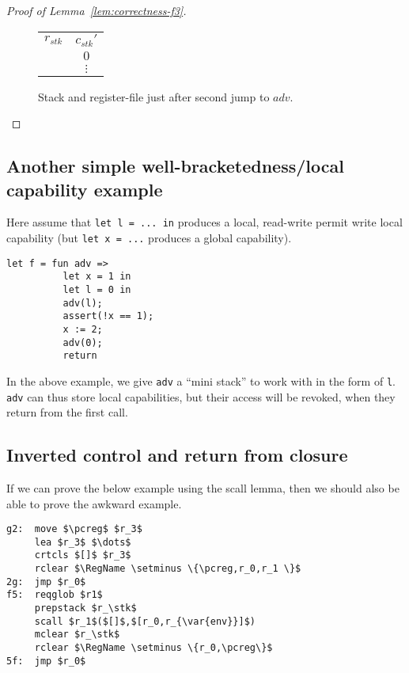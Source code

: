 \documentclass[a4paper]{article}
\newcommand{\var}[1]{\mathit{#1}}
\newcommand{\pcreg}{\mathrm{pc}}
\newcommand{\adv}{\var{adv}}
\newcommand{\stk}{\var{stk}}
\newcommand{\plaindom}[1]{\mathrm{#1}}
\newcommand{\RegName}{\plaindom{RegisterName}}
\begin{document}
\begin{proof}[Proof of Lemma~\ref{lem:correctness-f3}]
\begin{enumproof}[start=3]
\begin{enumproof}[start=3]
\begin{figure}
\begin{tabular}{r |c |}
          \cline{2-2}
          $r_{\var{stk}}$  & $c_{\var{stk}}'$ \\
          \cline{2-2}
                   & $0$ \\
          \cline{2-2}
                   & $\vdots$ \\
          \cline{2-2}
        \end{tabular}
        \caption{Stack and register-file just after second jump to $\adv$.}
        \label{fig:f3-stack-before-snd-adv}
      \end{figure}
    \end{enumproof}
  \end{enumproof}
\end{proof}

\subsection{Another simple well-bracketedness/local capability example}
Here assume that \texttt{let l = ... in} produces a local, read-write permit write local capability (but \texttt{let x = ...} produces a global capability). 
\begin{verbatim}
let f = fun adv =>
          let x = 1 in
          let l = 0 in
          adv(l);
          assert(!x == 1);
          x := 2;
          adv(0);
          return
\end{verbatim}
In the above example, we give \texttt{adv} a ``mini stack'' to work with in the form of \texttt{l}. \texttt{adv} can thus store local capabilities, but their access will be revoked, when they return from the first call.

\subsection{Inverted control and return from closure}
If we can prove the below example using the scall lemma, then we should also be able to prove the awkward example.
\begin{lstlisting}
g2:  move $\pcreg$ $r_3$
     lea $r_3$ $\dots$
     crtcls $[]$ $r_3$
     rclear $\RegName \setminus \{\pcreg,r_0,r_1 \}$
2g:  jmp $r_0$
f5:  reqglob $r1$
     prepstack $r_\stk$
     scall $r_1$($[]$,$[r_0,r_{\var{env}}]$)
     mclear $r_\stk$
     rclear $\RegName \setminus \{r_0,\pcreg\}$
5f:  jmp $r_0$
\end{lstlisting}
\end{document}
